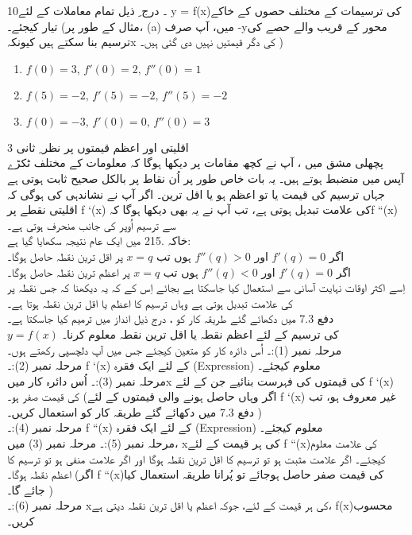 10۔ درج  ِ ذیل تمام معاملات کے لئے y = f(x)کی ترسیمات کے مختلف حصوں کے خاکے تیار کیجئے۔ (مثال کے طور پر، (a) میں،  آپ صرف -yمحور کے قریب والے حصے کی ترسیم بنا سکتے ہیں کیونکہx  کی دگر قیمتیں نہیں دی گئی ہیں۔ )\\
  \begin{multicols}{2}
  \begin{enumerate}[.a]
  \item \( f(0)=3, \,  f'(0)=2, \,f''(0)=1 \)
  \item \( f(5)=-2, \, f'(5)=-2, \,f''(5)=-2 \)
  \item \( f(0)=-3, \, f'(0)=0, \,f''(0)=3\)
  \end{enumerate}
  \end{multicols}
3 اقلیتی  اور اعظم  قیمتوں پر نظر ِ ثانی \\
	پچھلی مشق میں ، آپ نے کچھ مقامات پر دیکھا ہوگا کہ معلومات کے مختلف ٹکڑے آپس میں منضبط ہوتے ہیں۔ یہ بات خاص طور پر اُن نقاط پر بالکل صحیح ثابت ہوتی ہے جہاں ترسیم کی قیمت یا تو اعظم ہو یا اقل ترین۔ اگر آپ نے نشاندہی کی ہوگی کہ اقلیتی نقطے  پر f `(x) کی علامت تبدیل ہوتی ہے، تب آپ نے یہ بھی دیکھا ہوگا کہf ``(x)  سے ترسیم اُوپر کی جانب منحرف ہوتی ہے۔ \\
	خاکہ .215 میں ایک عام نتیجہ سکھایا گیا ہے:\\
اگر   
   \(f'(q)=0\)
اور
    \(f''(q)>0\)
   ہوں تب
     \(x=q\)
       پر اقل ترین نقطہ حاصل ہوگا۔ \\
اگر 
\(f'(q)=0\)
  اور
  \(f''(q)<0\)
     ہوں تب  
        \(x=q\)
       پر اعظم ترین نقطہ حاصل ہوگا۔ \\
اِسے اکثر اوقات نہایت آسانی سے استعمال کیا جاسکتا ہے بجائے اِس کے کہ یہ دیکھنا کہ جس نقطہ پر   کی علامت تبدیل ہوتی ہے وہاں ترسیم کا اعظم یا اقل ترین نقطہ ہوتا ہے۔  \\
دفع 7.3  میں دکھائے گئے طریقہ کار کو ، درج ذیل انداز میں ترمیم کیا جاسکتا ہے۔ \\
 \(y=f(x)\)
 کی ترسیم کے لئے اعظم نقطہ یا اقل ترین نقطہ معلوم کرنا۔\\
مرحلہ نمبر (1):۔ اُس دائرہ کار کو متعین کیجئے جس میں آپ دلچسپی رکھتے ہوں۔\\
مرحلہ نمبر (2):۔ f `(x) کے لئے ایک فقرہ (Expression) معلوم کیجئے۔ \\
مرحلہ نمبر (3):۔ اُس دائرہ کار میںx  کی قیمتوں کی فہرست بنائیے جن کے لئے f `(x)  کی قیمت صفر ہو۔  (اگر وہاں حاصل ہونے والی قیمتوں کے لئے f `(x) غیر معروف  ہو، تب دفع 7.3  میں دکھائے گئے طریقہ کار کو استعمال کریں۔ )\\
مرحلہ نمبر (4):۔ f ``(x) کے لئے ایک فقرہ (Expression) معلوم کیجئے۔\\
مرحلہ نمبر (5):۔ مرحلہ نمبر (3) میں،  xکی ہر قیمت کے لئے f ``(x)کی علامت معلوم کیجئے۔ اگر علامت مثبت ہو تو ترسیم کا اقل ترین نقطہ ہوگا اور اگر علامت منفی ہو تو ترسیم کا اعظم نقطہ ہوگا۔  (اگر f ``(x)کی قیمت صفر حاصل ہوجائے تو پُرانا طریقہ استعمال کیا جائے گا۔ )\\
مرحلہ نمبر (6):۔  xکی ہر قیمت کے لئے، جوکہ اعظم یا اقل ترین نقطہ دیتی ہے، f(x)محسوب کریں۔ \\

